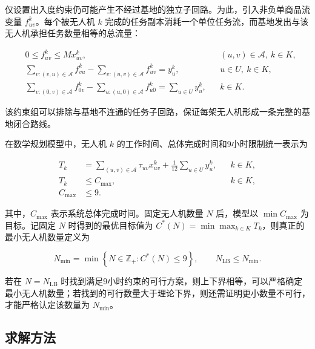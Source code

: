\documentclass[UTF8,a4paper,12pt]{ctexart}
\numberwithin{equation}{section}
\numberwithin{equation}{section}
\begin{document}
仅设置出入度约束仍可能产生不经过基地的独立子回路。为此，引入非负单商品流变量 \(f_{uv}^k\)。每个被无人机 \(k\) 完成的任务副本消耗一个单位任务流，而基地发出与该无人机承担任务数量相等的总流量：

\begin{equation}
\begin{aligned}
  &0\leq f_{uv}^k\leq Mx_{uv}^k,
  &&(u,v)\in\mathcal A,\ k\in K,\\
  &\sum_{v:(v,u)\in\mathcal A}f_{vu}^k
  -
  \sum_{v:(u,v)\in\mathcal A}f_{uv}^k
  =y_u^k,
  &&u\in U,\ k\in K,\\
  &\sum_{v:(0,v)\in\mathcal A}f_{0v}^k
  -
  \sum_{u:(u,0)\in\mathcal A}f_{u0}^k
  =
  \sum_{u\in U}y_u^k,
  &&k\in K.
\end{aligned}
\label{eq:q1-flow-constraints}
\end{equation}

该约束组可以排除与基地不连通的任务子回路，保证每架无人机形成一条完整的基地闭合路线。

在数学规划模型中，无人机 \(k\) 的工作时间、总体完成时间和9小时限制统一表示为

\begin{equation}
\begin{aligned}
  T_k
  &=
  \sum_{(u,v)\in\mathcal A}\tau_{uv}x_{uv}^k
  +\frac{1}{12}\sum_{u\in U}y_u^k,
  &&k\in K,\\
  T_k&\leq C_{\max},
  &&k\in K,\\
  C_{\max}&\leq9.
\end{aligned}
\label{eq:q1-time-constraints}
\end{equation}

其中，\(C_{\max}\) 表示系统总体完成时间。固定无人机数量 \(N\) 后，模型以
\(\min C_{\max}\) 为目标。记固定 \(N\) 时得到的最优目标值为
\(C^*(N)=\min\max_{k\in K}T_k\)，则真正的最小无人机数量定义为

\begin{equation}
  N_{\min}
  =
  \min
  \left\{
  N\in\mathbb Z_+:
  C^*(N)\leq9
  \right\},
  \qquad
  N_{\mathrm{LB}}\leq N_{\min}.
  \label{eq:q1-n-min}
\end{equation}

若在 \(N=N_{\mathrm{LB}}\) 时找到满足9小时约束的可行方案，则上下界相等，可以严格确定最小无人机数量；若找到的可行数量大于理论下界，则还需证明更小数量不可行，才能严格认定该数量为 \(N_{\min}\)。

\subsection{求解方法}
\end{document}
